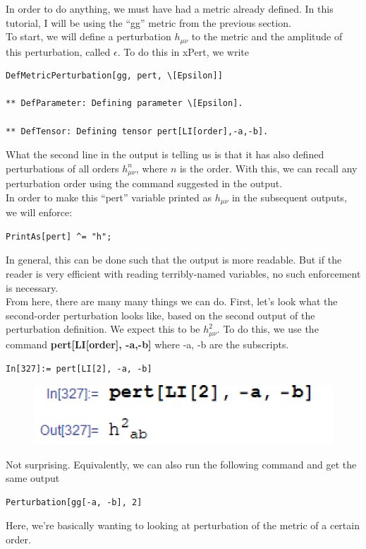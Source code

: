 \documentclass{book}
\theoremstyle{definition}
\begin{document}
In order to do anything, we must have had a metric already defined. In this tutorial, I will be using the ``gg'' metric from the previous section. \\

To start, we will define a perturbation $h_{\mu\nu}$ to the metric and the amplitude of this perturbation, called $\epsilon$. To do this in xPert, we write
\begin{lstlisting}
DefMetricPerturbation[gg, pert, \[Epsilon]]

** DefParameter: Defining parameter \[Epsilon]. 

** DefTensor: Defining tensor pert[LI[order],-a,-b]. 
\end{lstlisting}
What the second line in the output is telling us is that it has also defined perturbations of all orders $h_{\mu\nu}^n$, where $n$ is the order. With this, we can recall any perturbation order using the command suggested in the output. \\

In order to make this ``pert'' variable printed as $h_{\mu\nu}$ in the subsequent outputs, we will enforce:
\begin{lstlisting}
PrintAs[pert] ^= "h";
\end{lstlisting}

In general, this can be done such that the output is more readable. But if the reader is very efficient with reading terribly-named variables, no such enforcement is necessary.\\

From here, there are many many things we can do. First, let's look what the second-order perturbation looks like, based on the second output of the perturbation definition. We expect this to be $h_{\mu\nu}^2$. To do this, we use the command \textbf{pert[LI[order], -a,-b]} where -a, -b are the subscripts.
\begin{lstlisting}
In[327]:= pert[LI[2], -a, -b]
\end{lstlisting}
\begin{figure}[!htb]
	\includegraphics[scale=0.25]{h2}
\end{figure}
Not surprising. Equivalently, we can also run the following command and get the same output
\begin{lstlisting}
Perturbation[gg[-a, -b], 2]
\end{lstlisting}
Here, we're basically wanting to looking at perturbation of the metric of a certain order. \\
\end{document}
